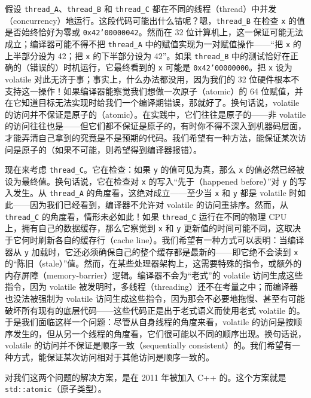假设 \texttt{thread\_\allowbreak{}A}、\texttt{thread\_\allowbreak{}B} 和 \texttt{thread\_\allowbreak{}C} 都在不同的线程（thread）中并发（concurrency）地运行。这段代码可能出什么错呢？嗯，\texttt{thread\_\allowbreak{}B} 在检查 \texttt{x} 的值是否始终恰好为零或 \texttt{0x42'00000042}。然而在 32 位计算机上，这一保证可能无法成立；编译器可能不得不把 \texttt{thread\_\allowbreak{}A} 中的赋值实现为一对赋值操作——“把 \texttt{x} 的上半部分设为 42；把 \texttt{x} 的下半部分设为 42”。如果 \texttt{thread\_\allowbreak{}B} 中的测试恰好在正确的（错误的）时机运行，它最终看到的 \texttt{x} 可能是 \texttt{0x42'00000000}。把 \texttt{x} 设为 volatile 对此无济于事；事实上，什么办法都没用，因为我们的 32 位硬件根本不支持这一操作！如果编译器能察觉我们想做一次原子（atomic）的 64 位赋值，并在它知道目标无法实现时给我们一个编译期错误，那就好了。换句话说，volatile 的访问并不保证是原子的（atomic）。在实践中，它们往往是原子的——非 volatile 的访问往往也是——但它们都不保证是原子的，有时你不得不深入到机器码层面，才能弄清自己拿到的究竟是不是预期的代码。我们希望有一种方法，能保证某次访问是原子的（如果不可能，则希望得到编译器报错）。

现在来考虑 \texttt{thread\_\allowbreak{}C}。它在检查：如果 \texttt{y} 的值可见为真，那么 \texttt{x} 的值必然已经被设为最终值。换句话说，它在检查对 \texttt{x} 的写入“先于（happened before）”对 \texttt{y} 的写入发生。从 \texttt{thread\_\allowbreak{}A} 的角度看，这绝对成立——至少当 \texttt{x} 和 \texttt{y} 都是 volatile 时如此——因为我们已经看到，编译器不允许对 volatile 的访问重排序。然而，从 \texttt{thread\_\allowbreak{}C} 的角度看，情形未必如此！如果 \texttt{thread\_\allowbreak{}C} 运行在不同的物理 CPU 上，拥有自己的数据缓存，那么它察觉到 \texttt{x} 和 \texttt{y} 更新值的时间可能不同，这取决于它何时刷新各自的缓存行（cache line）。我们希望有一种方式可以表明：当编译器从 \texttt{y} 加载时，它还必须确保自己的整个缓存都是最新的——即它绝不会读到 \texttt{x} 的“陈旧（stale）”值。然而，在某些处理器架构上，这需要特殊的指令，或额外的内存屏障（memory-barrier）逻辑。编译器不会为“老式”的 volatile 访问生成这些指令，因为 volatile 被发明时，多线程（threading）还不在考量之中；而编译器也没法被强制为 volatile 访问生成这些指令，因为那会不必要地拖慢、甚至有可能破坏所有现有的底层代码——这些代码正是出于老式语义而使用老式 volatile 的。于是我们面临这样一个问题：尽管从自身线程的角度来看，volatile 的访问是按顺序发生的，但从另一个线程的角度看，它们很可能以不同的顺序出现。换句话说，volatile 的访问并不保证是顺序一致（sequentially consistent）的。我们希望有一种方式，能保证某次访问相对于其他访问是顺序一致的。

对我们这两个问题的解决方案，是在 2011 年被加入 C++ 的。这个方案就是 \texttt{std::\allowbreak{}atomic}（原子类型）。

